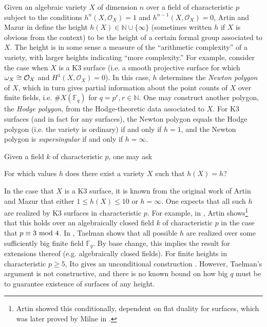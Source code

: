 Given an algebraic variety \(X\) of dimension \(n\) over a field of characteristic \(p\)
subject to the conditions \(h^n(X,\mathcal{O}_X)=1\) and
\(h^{n-1}(X,\mathcal{O}_X)=0\),
Artin and Mazur in \cite{artin-mazur-1977-height}
define the height \(h(X) \in \mathbb{N} \cup \{\infty\}\) 
(sometimes written \(h\) if \(X\) is obvious from the context)
to be the height 
of a certain formal group associated to \(X\).
The height is in some sense a measure of the
``arithmetic complexity'' of a variety,
with larger heights indicating ``more complexity.''
For example, consider the case when \(X\) is a 
K3 surface (i.e. a smooth projective surface for which \(\omega_{X} \cong \mathcal{O}_{X} \)
and \(H^{1}(X,\mathcal{O}_{X} ) = 0\)).
In this case, \(h\) determines the \textit{Newton polygon}
of \(X\), which in turn gives partial information about the 
point counts of \(X\) over finite fields,
i.e. \(\#X(\mathbb{F}_{q})\) for \(q = p^{r}, r \in \mathbb{N}\).
One may construct another polygon, the \textit{Hodge polygon},
from the Hodge-theoretic data associated to \(X\).
For K3 surfaces (and in fact for any surfaces), 
the Newton polygon equals the Hodge polygon
(i.e. the variety is ordinary) if and only if \(h=1\),
and the Newton polygon is \textit{supersingular} if and only if 
\(h = \infty\).

Given a field \(k\) of characteristic \(p\), one may ask

\begin{quest}
    For which values \(h\) does there exist a variety
    \(X\) such that \(h(X) = h\)?
\end{quest}

In the case that \(X\) is a K3 surface, it is known from the 
original work of Artin and Mazur
that either \(1 \leq h(X) \leq 10\) or \(h = \infty\).
One expects that all such $h$ are realized by K3 surfaces
in characteristic $p$.
For example, in \cite{artin-1974-k3-surfaces},
Artin shows\footnote{
    Artin showed this conditionally, dependent on flat
    duality for surfaces, which was later proved
    by Milne in \cite{milne-1976-flat-duality}.
}
that this holds over an algebraically
closed field \(k\) of characteristic \(p\) in the
case that \(p \equiv 3 \text{ mod } 4\).
In \cite{taelman-2016-k3-given-l-function}, 
Taelman shows that
all possible \(h\) are realized
over some sufficiently big finite field \(\mathbb{F}_{q}\). 
By base change, this implies the result for extensions
thereof (e.g. algebraically closed fields).
For finite heights in characteristic \(p \geq 5\), Ito gives an unconditional construction \cite[Theorem~6.4]{ito-2016-k3-given-l-function}.
However, Taelman's argument is not constructive,
and there is no known bound on how big \(q\) must be to guarantee
existence of surfaces of any height.

